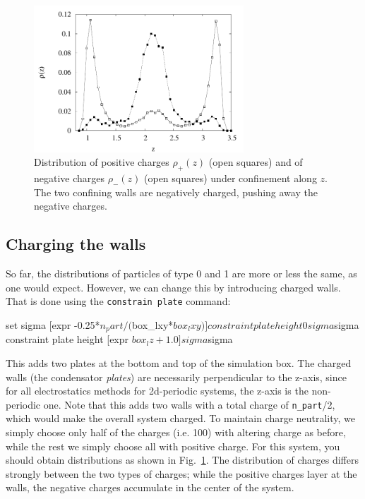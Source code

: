 \documentclass[
a4paper,                        %
11pt,                           %
twoside,                        %
footsepline,                    %
headsepline,                    %
headexclude,                    %
footexclude,                    %
pagesize,                       %
]{scrartcl}
\begin{document}
\begin{figure}[t]
  \centering
  \includegraphics[width=0.7\textwidth]{figures/nonneutral-rho.pdf}
  \caption{Distribution of positive charges $\rho_+(z)$ (open squares)
    and of negative charges $\rho_-(z)$ (open squares) under
    confinement along $z$. The two confining walls are negatively
    charged, pushing away the negative charges.}
  \label{fig:nonneutralrho}
\end{figure}

\subsection*{Charging the walls}

So far, the distributions of particles of type 0 and 1 are more or
less the same, as one would expect. However, we can change this by
introducing charged walls. That is done using the
\verb|constrain plate| command:

\begin{tclcode}
  set sigma [expr -0.25*$n_part/($box_lxy*$box_lxy)]
  constraint plate height 0 sigma $sigma
  constraint plate height [expr $box_lz + 1.0] sigma $sigma
\end{tclcode}

This adds two plates at the bottom and top of the simulation box. The
charged walls (the condensator \emph{plates}) are necessarily
perpendicular to the z-axis, since for all electrostatics methods for
2d-periodic systems, the z-axis is the non-periodic one. Note that
this adds two walls with a total charge of \verb|n_part|/2, which
would make the overall system charged. To maintain charge neutrality,
we simply choose only half of the charges (i.e. 100) with altering
charge as before, while the rest we simply choose all with positive
charge. For this system, you should obtain distributions as shown in
Fig.~\ref{fig:nonneutralrho}. The distribution of charges differs
strongly between the two types of charges; while the positive charges
layer at the walls, the negative charges accumulate in the center of
the system.
\end{document}
